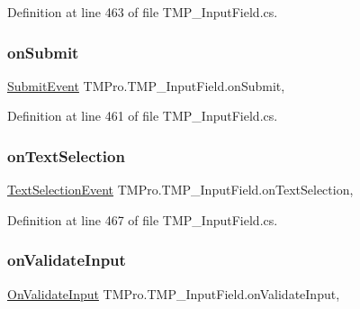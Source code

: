 Definition at line 463 of file T\+M\+P\+\_\+\+Input\+Field.\+cs.

\mbox{\label{class_t_m_pro_1_1_t_m_p___input_field_a5c3e2616c6bb71a9648f87c547f1b1e2}} 
\subsubsection{\texorpdfstring{onSubmit}{onSubmit}}
{\footnotesize\ttfamily \mbox{\hyperlink{class_t_m_pro_1_1_t_m_p___input_field_1_1_submit_event}{Submit\+Event}} T\+M\+Pro.\+T\+M\+P\+\_\+\+Input\+Field.\+on\+Submit\hspace{0.3cm}{\ttfamily [get]}, {\ttfamily [set]}}



Definition at line 461 of file T\+M\+P\+\_\+\+Input\+Field.\+cs.

\mbox{\label{class_t_m_pro_1_1_t_m_p___input_field_af1c52092e530ca45a1af4f2653fe320b}} 
\subsubsection{\texorpdfstring{onTextSelection}{onTextSelection}}
{\footnotesize\ttfamily \mbox{\hyperlink{class_t_m_pro_1_1_t_m_p___input_field_1_1_text_selection_event}{Text\+Selection\+Event}} T\+M\+Pro.\+T\+M\+P\+\_\+\+Input\+Field.\+on\+Text\+Selection\hspace{0.3cm}{\ttfamily [get]}, {\ttfamily [set]}}



Definition at line 467 of file T\+M\+P\+\_\+\+Input\+Field.\+cs.

\mbox{\label{class_t_m_pro_1_1_t_m_p___input_field_aee71958e449b48fa7df100ca8c9c5409}} 
\subsubsection{\texorpdfstring{onValidateInput}{onValidateInput}}
{\footnotesize\ttfamily \mbox{\hyperlink{class_t_m_pro_1_1_t_m_p___input_field_a34dece90fcdb81bf3489208eab7a8a82}{On\+Validate\+Input}} T\+M\+Pro.\+T\+M\+P\+\_\+\+Input\+Field.\+on\+Validate\+Input\hspace{0.3cm}{\ttfamily [get]}, {\ttfamily [set]}}




